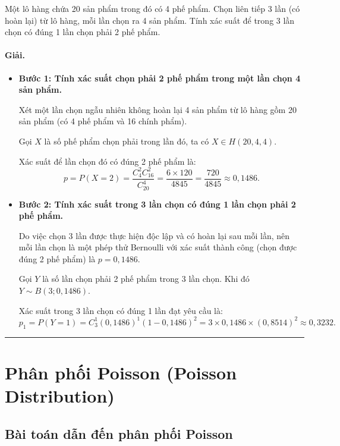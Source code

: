 \begin{vidu}[VD 6]
Một lô hàng chứa 20 sản phẩm trong đó có 4 phế phẩm. Chọn liên tiếp 3 lần (có hoàn lại) từ lô hàng, mỗi lần chọn ra 4 sản phẩm. Tính xác suất để trong 3 lần chọn có đúng 1 lần chọn phải 2 phế phẩm.

\paragraph{Giải.}
\begin{itemize}
    \item \textbf{Bước 1: Tính xác suất chọn phải 2 phế phẩm trong một lần chọn 4 sản phẩm.}
    
    Xét một lần chọn ngẫu nhiên không hoàn lại 4 sản phẩm từ lô hàng gồm 20 sản phẩm (có 4 phế phẩm và 16 chính phẩm).
    
    Gọi $X$ là số phế phẩm chọn phải trong lần đó, ta có $X \in H(20, 4, 4)$.
    
    Xác suất để lần chọn đó có đúng 2 phế phẩm là:
    \[
    p = P(X = 2) = \frac{C_4^2 C_{16}^2}{C_{20}^4} = \frac{6 \times 120}{4845} = \frac{720}{4845} \approx 0{,}1486.
    \]

    \item \textbf{Bước 2: Tính xác suất trong 3 lần chọn có đúng 1 lần chọn phải 2 phế phẩm.}
    
    Do việc chọn 3 lần được thực hiện độc lập và có hoàn lại sau mỗi lần, nên mỗi lần chọn là một phép thử Bernoulli với xác suất thành công (chọn được đúng 2 phế phẩm) là $p = 0{,}1486$.
    
    Gọi $Y$ là số lần chọn phải 2 phế phẩm trong 3 lần chọn. Khi đó $Y \sim B(3; 0{,}1486)$.
    
    Xác suất trong 3 lần chọn có đúng 1 lần đạt yêu cầu là:
    \[
    p_1 = P(Y = 1) = C_3^1 (0{,}1486)^1 (1 - 0{,}1486)^2 = 3 \times 0{,}1486 \times (0{,}8514)^2 \approx 0{,}3232.
    \]
\end{itemize}
\end{vidu}

\vspace{1.5em}
\hrule
\vspace{1.5em}

\section{Phân phối Poisson (Poisson Distribution)}

\subsection{Bài toán dẫn đến phân phối Poisson}

